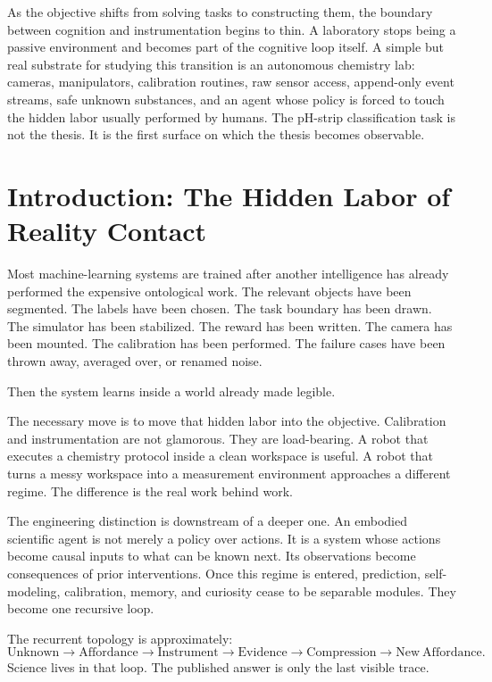 \documentclass[11pt]{article}
\begin{document}
As the objective shifts from solving tasks to constructing them, the boundary between cognition and instrumentation begins to thin. A laboratory stops being a passive environment and becomes part of the cognitive loop itself. A simple but real substrate for studying this transition is an autonomous chemistry lab: cameras, manipulators, calibration routines, raw sensor access, append-only event streams, safe unknown substances, and an agent whose policy is forced to touch the hidden labor usually performed by humans. The pH-strip classification task is not the thesis. It is the first surface on which the thesis becomes observable.

\section{Introduction: The Hidden Labor of Reality Contact}

Most machine-learning systems are trained after another intelligence has already performed the expensive ontological work. The relevant objects have been segmented. The labels have been chosen. The task boundary has been drawn. The simulator has been stabilized. The reward has been written. The camera has been mounted. The calibration has been performed. The failure cases have been thrown away, averaged over, or renamed noise.

Then the system learns inside a world already made legible.

The necessary move is to move that hidden labor into the objective. Calibration and instrumentation are not glamorous. They are load-bearing. A robot that executes a chemistry protocol inside a clean workspace is useful. A robot that turns a messy workspace into a measurement environment approaches a different regime. The difference is the real work behind work.

The engineering distinction is downstream of a deeper one. An embodied scientific agent is not merely a policy over actions. It is a system whose actions become causal inputs to what can be known next. Its observations become consequences of prior interventions. Once this regime is entered, prediction, self-modeling, calibration, memory, and curiosity cease to be separable modules. They become one recursive loop.

The recurrent topology is approximately:
\begin{equation}
  \mathrm{Unknown}\rightarrow \mathrm{Affordance}\rightarrow \mathrm{Instrument}\rightarrow \mathrm{Evidence}\rightarrow \mathrm{Compression}\rightarrow \mathrm{New\ Affordance}.
\end{equation}
Science lives in that loop. The published answer is only the last visible trace.
\end{document}
